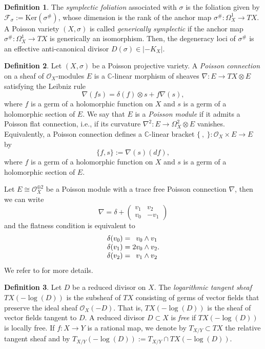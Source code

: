 \documentclass[twoside]{amsart}
\numberwithin{equation}{section}
\def\OO{\mathcal{O}}
\newcommand{\sF}{\mathscr{F}}
\theoremstyle{definition}
\newtheorem{definition}{Definition}[section]
\begin{document}
\begin{definition}
The {\it symplectic foliation} associated with  $\sigma$ is the foliation given by $\sF_{\sigma}:= \mathrm{Ker}(\sigma^{\#})$, whose dimension is the rank of  the anchor map 
$\sigma^{\#}: \Omega_X^1\to TX$. 
A Poisson variety $(X,\sigma)$ is called \emph{generically symplectic} if the anchor map $\sigma^{\#}\colon \Omega_X^1\to TX$ is generically an isomorphism. 
Then, the degeneracy loci of $\sigma^{\#}$ is an effective anti-canonical divisor $D(\sigma)\in |-K_X|$.
\end{definition}



\begin{definition}
Let $(X,\sigma)$ be a Poisson projective variety. A {\it Poisson connection} on a sheaf of $\OO_X$-modules $E$ is a 
$\mathbb{C}$-linear morphism of sheaves 
$\nabla: E \to TX \otimes E$ satisfying the Leibniz rule
$$
\nabla(fs) = \delta(f) \otimes s + f \nabla(s),
$$
where $f$ is a germ of a holomorphic function on $X$ and $s$ is a germ of a holomorphic section of $E$. We say that $E$ is a \emph{Poisson module} if it admits a Poisson flat connection, i.e., if its curvature $\nabla^2\colon E \to \Omega_X^2 \otimes E$ vanishes.
Equivalently, a Poisson connection defines a $\mathbb{C}$-linear bracket $\{ \ , \ \} \colon \OO_X \times E \to E$ by
$$
\{ f, s \} := \nabla(s)(df), 
$$
where $f$ is a germ of a holomorphic function on $X$ and $s$ is a germ of a holomorphic section of $E$. \end{definition}

Let $E\cong \OO_{X}^{\oplus 2}$ be a Poisson module with a trace free Poisson connection $\nabla$, then we can write 
$$
 \nabla=\delta +\begin{pmatrix}v_1 &v_2
 \\v_0&-v_1\end{pmatrix} 
$$
and the flatness condition is equivalent to 
$$ 
 \begin{matrix}
\delta(v_0)=\hfill v_0\wedge v_1\\
\delta(v_1)=2v_0\wedge v_2\\
\delta(v_2)=\hfill v_1\wedge v_2
\end{matrix} .
$$
We refer to \cite{Morita} for more details. 
 \begin{definition}
 Let $D$ be a reduced divisor on $X$. The \emph{logarithmic tangent sheaf} $TX(-\log(D))$ is the subsheaf of $TX$ consisting of germs of vector fields that preserve the ideal sheaf $\OO_X(-D)$. That is, $TX(-\log(D))$ is the sheaf of vector fields tangent to $D$. A reduced divisor $D \subset X$ is \emph{free} if $TX(-\log(D))$ is locally free. If $f : X \to Y$ is a rational map, we denote by $T_{X/Y} \subset TX$ the relative tangent sheaf and by $T_{X/Y}(-\log(D)) := T_{X/Y} \cap TX(-\log(D))$.
\end{definition}
\end{document}
